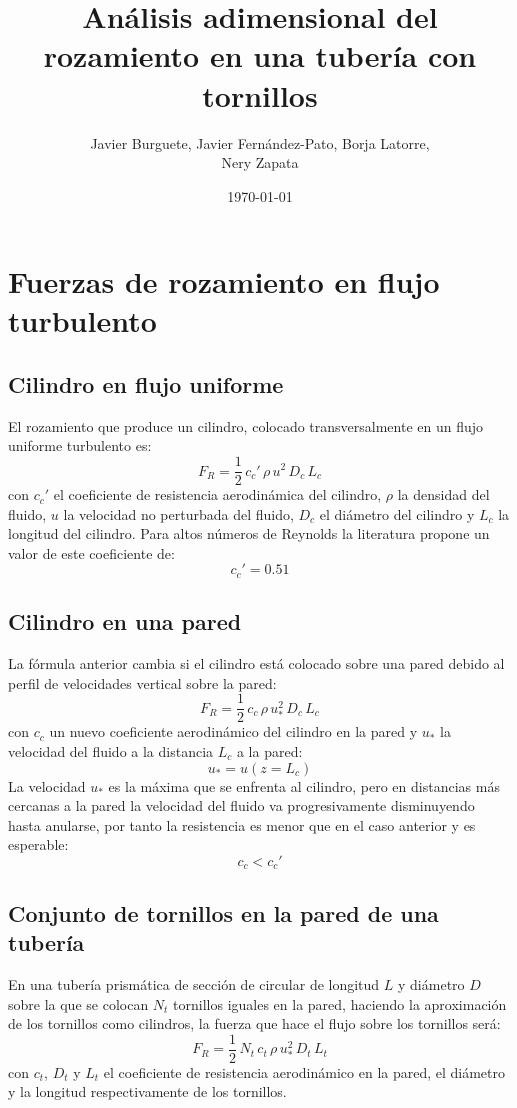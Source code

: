 \documentclass[a4paper]{article}
\author{Javier Burguete, Javier Fernández-Pato, Borja Latorre,\\ Nery Zapata}
\date{\today}
\title{Análisis adimensional del rozamiento en una tubería con tornillos}
\newcommand{\EQ}[2]{\begin{equation}#1\label{#2}\end{equation}}
\begin{document}
\maketitle

\section{Fuerzas de rozamiento en flujo turbulento}

\subsection{Cilindro en flujo uniforme}

El rozamiento que produce un cilindro, colocado transversalmente en un flujo
uniforme turbulento es:
\EQ{F_R=\frac12\,c_c'\,\rho\,u^2\,D_c\,L_c}{EqFrCilindroUniforme}
con $c_c'$ el coeficiente de resistencia aerodinámica del cilindro, $\rho$ la
densidad del fluido, $u$ la velocidad no perturbada del fluido, $D_c$ el
diámetro del cilindro y $L_c$ la longitud del cilindro. Para altos números de
Reynolds la literatura propone un valor de este coeficiente de:
\EQ{c_c'=0.51}{EqCc}

\subsection{Cilindro en una pared}

La fórmula anterior cambia si el cilindro está colocado sobre una pared debido
al perfil de velocidades vertical sobre la pared:
\EQ{F_R=\frac12\,c_c\,\rho\,u_*^2\,D_c\,L_c}{EqFrCilindroPared}
con $c_c$ un nuevo coeficiente aerodinámico del cilindro en la pared y $u_*$ la
velocidad del fluido a la distancia $L_c$ a la pared:
\EQ{u_*=u\left(z=L_c\right)}{EqUAsterisco}
La velocidad $u_*$ es la máxima que se enfrenta al cilindro, pero en distancias
más cercanas a la pared la velocidad del fluido va progresivamente disminuyendo
hasta anularse, por tanto la resistencia es menor que en el caso anterior y es
esperable:
\EQ{c_c<c_c'}{EqCcII}

\subsection{Conjunto de tornillos en la pared de una tubería}

En una tubería prismática de sección de circular de longitud $L$ y diámetro $D$
sobre la que se colocan $N_t$ tornillos iguales en la pared, haciendo la
aproximación de los tornillos como cilindros, la fuerza que hace el flujo
sobre los tornillos será:
\EQ{F_R=\frac12\,N_t\,c_t\,\rho\,u_*^2\,D_t\,L_t}{EqFrTornillos}
con $c_t$, $D_t$ y $L_t$ el coeficiente de resistencia aerodinámico en la pared,
el diámetro y la longitud respectivamente de los tornillos.
\end{document}
